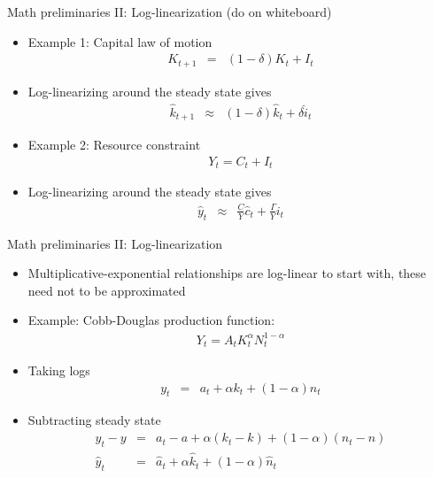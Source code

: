 \documentclass[9pt,xcolor={dvipsnames}]{beamer}
\newcommand{\bit}{\begin{itemize}}
\newcommand{\eit}{\end{itemize}}
\newcommand{\rc}{\color{red}}
\begin{document}
\begin{frame}{Math preliminaries II: Log-linearization {\rc (do on whiteboard)}}

\bit
\setlength\itemsep{1.5em}

\item Example 1: Capital law of motion
\begin{eqnarray}
K_{t+1} &=& (1-\delta) K_t + I_t \nonumber 
\end{eqnarray}

\item Log-linearizing around the steady state gives
\begin{eqnarray}
\hat k_{t+1} &\approx& (1-\delta) \hat k_t +\delta \hat i_t \nonumber
\end{eqnarray} 

\item Example 2: Resource constraint
\begin{eqnarray}
Y_{t} = C_t + I_t \nonumber
\end{eqnarray}

\item Log-linearizing around the steady state gives
\begin{eqnarray}
\hat y_{t} &\approx& \frac{ C}{Y} \hat c_t + \frac{I}{Y} \hat i_t \nonumber
\end{eqnarray} 

\eit

\end{frame}



\begin{frame}{Math preliminaries II: Log-linearization}

\bit
\setlength\itemsep{1.5em}

\item Multiplicative-exponential relationships are log-linear to start with, these need not to be approximated

\item Example: Cobb-Douglas production function:
\begin{eqnarray}
Y_t = A_t K_t^{\alpha}N_t^{1-\alpha} \nonumber
\end{eqnarray}

\item Taking logs
\begin{eqnarray}
y_t &=& a_t + \alpha k_t  + (1-\alpha)  n_t \nonumber
\end{eqnarray} 

\item Subtracting steady state
\begin{eqnarray}
y_t-y &=& a_t-a + \alpha (k_t-k)  + (1-\alpha)  (n_t-n) \nonumber \\
\hat y_t &=& \hat a_t + \alpha \hat k_t  + (1-\alpha)  \hat n_t \nonumber
\end{eqnarray} 

\eit

\end{frame}
\end{document}
